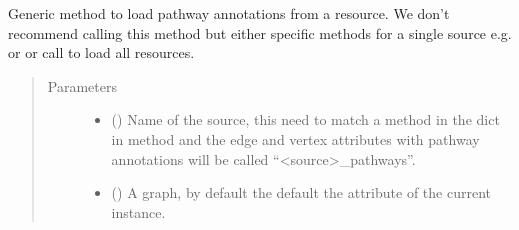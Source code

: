 \documentclass[letterpaper,10pt,english]{sphinxmanual}
\begin{document}
\begin{fulllineitems}
\begin{fulllineitems}
\label{\detokenize{main:pypath.main.PyPath.load_pathways}}
Generic method to load pathway annotations from a resource.
We don’t recommend calling this method but either specific
methods for a single source e.g. 
or  or call  to
load all resources.
\begin{quote}\begin{description}
\item[{Parameters}] \leavevmode\begin{itemize}
\item {} 
 () \textendash{} Name of the source, this need to match a method in the dict
in  method and the edge and vertex attributes
with pathway annotations will be called “\textless{}source\textgreater{}\_pathways”.

\item {} 
 () \textendash{} A graph, by default the default the  attribute of the
current instance.

\end{itemize}

\end{description}\end{quote}

\end{fulllineitems}


\begin{fulllineitems}
\label{\detokenize{main:pypath.main.PyPath.load_pdb}}
\end{fulllineitems}


\begin{fulllineitems}
\label{\detokenize{main:pypath.main.PyPath.load_pepcyber}}
\end{fulllineitems}


\end{fulllineitems}
\end{document}
